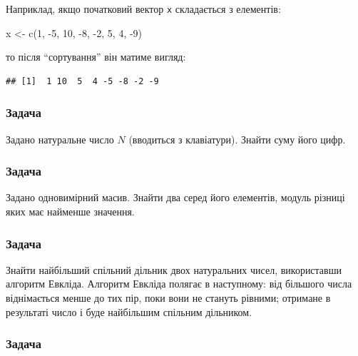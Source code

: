 \documentclass[
]{book}
\newenvironment{Shaded}{\begin{snugshade}}{\end{snugshade}}
\newcommand{\DecValTok}[1]{\textcolor[rgb]{0.00,0.00,0.81}{#1}}
\newcommand{\FunctionTok}[1]{\textcolor[rgb]{0.00,0.00,0.00}{#1}}
\newcommand{\NormalTok}[1]{#1}
\newcommand{\OtherTok}[1]{\textcolor[rgb]{0.56,0.35,0.01}{#1}}
\newcommand{\SpecialCharTok}[1]{\textcolor[rgb]{0.00,0.00,0.00}{#1}}
\begin{document}
Наприклад, якщо початковий вектор \texttt{x} складається з елементів:

\begin{Shaded}
\begin{Highlighting}[]
\NormalTok{x }\OtherTok{\textless{}{-}} \FunctionTok{c}\NormalTok{(}\DecValTok{1}\NormalTok{, }\SpecialCharTok{{-}}\DecValTok{5}\NormalTok{, }\DecValTok{10}\NormalTok{, }\SpecialCharTok{{-}}\DecValTok{8}\NormalTok{, }\SpecialCharTok{{-}}\DecValTok{2}\NormalTok{, }\DecValTok{5}\NormalTok{, }\DecValTok{4}\NormalTok{, }\SpecialCharTok{{-}}\DecValTok{9}\NormalTok{)}
\end{Highlighting}
\end{Shaded}

то після ``сортування'' він матиме вигляд:

\begin{verbatim}
## [1]  1 10  5  4 -5 -8 -2 -9
\end{verbatim}

\hypertarget{task6115}{%
\subsubsection{Задача}\label{task6115}}

Задано натуральне число \(N\) (вводиться з клавіатури). Знайти суму його цифр.

\hypertarget{task6116}{%
\subsubsection{Задача}\label{task6116}}

Задано одновимірний масив. Знайти два серед його елементів, модуль різниці яких має
найменше значення.

\hypertarget{task6117}{%
\subsubsection{Задача}\label{task6117}}

Знайти найбільший спільний дільник двох натуральних чисел, використавши алгоритм
Евкліда. Алгоритм Евкліда полягає в наступному: від більшого числа віднімається менше до тих пір,
поки вони не стануть рівними; отримане в результаті число і буде найбільшим спільним дільником.

\hypertarget{task6118}{%
\subsubsection{Задача}\label{task6118}}
\end{document}
